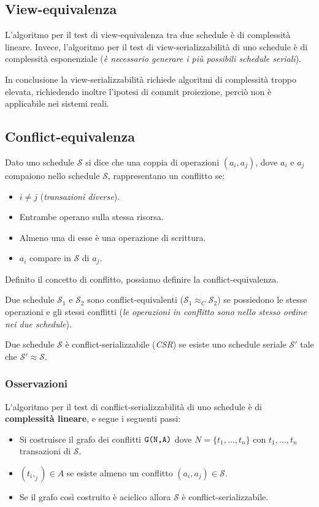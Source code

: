 \documentclass[oneside,a4paper,11pt]{book}
\theoremstyle{italicstyle}
\theoremstyle{normStyle}
\begin{document}
\subsection{View-equivalenza}
L'algoritmo per il test di view-equivalenza tra due schedule è di complessità 
lineare. Invece, l'algoritmo per il test di view-serializzabilità di uno schedule 
è di complessità esponenziale (\textit{è necessario generare i più possibili 
schedule seriali}).

In conclusione la view-serializzabilità richiede algoritmi di complessità 
troppo elevata, richiedendo inoltre l'ipotesi di commit proiezione, perciò 
non è applicabile nei sistemi reali.
\subsection{Conflict-equivalenza}
\begin{tcolorbox}[title = {Conflitto}]
  Dato uno schedule $\mathcal{S}$ si dice che una coppia di operazioni $(a_i,a_j)$, dove 
  $a_i$ e $a_j$ compaiono nello schedule $\mathcal{S}$, rappresentano un conflitto se:
  \begin{itemize}
    \item $i \not = j$ (\textit{transazioni diverse}).
    \item Entrambe operano sulla stessa risorsa.
    \item Almeno una di esse è una operazione di scrittura.
    \item $a_i$  compare in $\mathcal{S}$ di $a_j$.
  \end{itemize}
\end{tcolorbox}
Definito il concetto di conflitto, possiamo definire la conflict-equivalenza.
\begin{tcolorbox}[title = {Conflict-equivalenza}]
  Due schedule $\mathcal{S}_1$ e $\mathcal{S}_2$ sono conflict-equivalenti 
  ($\mathcal{S}_1 \approx_C \mathcal{S}_2$) se possiedono le stesse operazioni e gli stessi conflitti 
  (\textit{le operazioni in conflitto sono nello stesso ordine nei due schedule}).
\end{tcolorbox}
\begin{tcolorbox}[title = {Conflict-serializzabilità}]
  Due schedule $\mathcal{S}$ è conflict-serializzabile (\textit{CSR}) se esiste 
  uno schedule seriale $\mathcal{S}'$ tale che $\mathcal{S}' \approx \mathcal{S}$.
\end{tcolorbox}
\subsubsection{Osservazioni}
L'algoritmo per il test di conflict-serializzabilità di uno schedule è di 
\textbf{complessità lineare}, e segue i seguenti passi:
\begin{itemize}
  \item Si costruisce il grafo dei conflitti $\verb|G(N,A)|$ dove 
  $N=\{t_1,\dots,t_n\}$ con $t_1,\dots,t_n$ transazioni di $\mathcal{S}$.
  \item $(t_i,_j)\in A$ se esiste almeno un conflitto $(a_i,a_j) \in \mathcal{S}$.
  \item Se il grafo così costruito è aciclico allora $\mathcal{S}$ è conflict-serializzabile.
\end{itemize}
\end{document}
